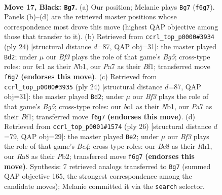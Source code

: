 \documentclass[11pt]{article}
\begin{document}
\clearpage

\begin{figure}[p]\centering
\begin{subfigure}{0.46\textwidth}\centering
\resizebox{\linewidth}{!}{%
\newchessgame
\chessboard[
  setfen={rnb1r1k1/pppnp2p/5b2/P5PR/2P5/1B3N2/1P3P2/RNB1K3 b Q - 0 17},
  showmover=false,
  pgfstyle=straightmove, color=movearrow, markmove={f6-g7}
]}
\caption{}
\end{subfigure}\hfill
\begin{subfigure}{0.46\textwidth}\centering
\resizebox{\linewidth}{!}{%
\newchessgame
\chessboard[
  setfen={rnb4r/ppp1k2p/1b3p2/3n2B1/3P4/5N2/PP4PP/RN2KB1R w KQ - 0 13},
  showmover=false,
  pgfstyle=straightmove, color=movearrow, markmove={g5-d2}
]}
\caption{}
\end{subfigure}
\\[4pt]
\begin{subfigure}{0.46\textwidth}\centering
\resizebox{\linewidth}{!}{%
\newchessgame
\chessboard[
  setfen={rnb4r/ppp1k2p/1b3p2/3n2B1/3P4/5N2/PP4PP/RN2KB1R w KQ - 0 13},
  showmover=false,
  pgfstyle=straightmove, color=movearrow, markmove={g5-d2}
]}
\caption{}
\end{subfigure}\hfill
\begin{subfigure}{0.46\textwidth}\centering
\resizebox{\linewidth}{!}{%
\newchessgame
\chessboard[
  setfen={rnb1k2r/b4pp1/p3p2p/1p6/2B1PPn1/1NN3P1/PP1B3P/R3K2R w KQkq - 0 14},
  showmover=false,
  pgfstyle=straightmove, color=movearrow, markmove={c4-e2}
]}
\caption{}
\end{subfigure}
\caption{\textbf{Move 17, Black: \texttt{Bg7}.} (a) Our position; Melanie plays \texttt{Bg7} (\texttt{f6g7}). Panels (b)--(d) are the retrieved master positions whose correspondence most drove this move (highest QAP objective among those that transfer to it). (b) Retrieved from \texttt{ccrl\_top\_p0000\#3934} (ply 24) [structural distance $d$=87, QAP obj=31]: the master played \texttt{Bd2}; under $\mu$ our \emph{Bf3} plays the role of that game's \emph{Bg5}; cross-type roles: our \emph{b}c1 as their \emph{N}b1, our \emph{P}a7 as their \emph{B}f1; transferred move \texttt{f6g7} \textbf{(endorses this move)}. (c) Retrieved from \texttt{ccrl\_top\_p0000\#3935} (ply 24) [structural distance $d$=87, QAP obj=31]: the master played \texttt{Bd2}; under $\mu$ our \emph{Bf3} plays the role of that game's \emph{Bg5}; cross-type roles: our \emph{b}c1 as their \emph{N}b1, our \emph{P}a7 as their \emph{B}f1; transferred move \texttt{f6g7} \textbf{(endorses this move)}. (d) Retrieved from \texttt{ccrl\_top\_p0001\#1574} (ply 26) [structural distance $d$=79, QAP obj=29]: the master played \texttt{Be2}; under $\mu$ our \emph{Bf3} plays the role of that game's \emph{Bc4}; cross-type roles: our \emph{B}c8 as their \emph{R}h1, our \emph{R}a8 as their \emph{P}b2; transferred move \texttt{f6g7} \textbf{(endorses this move)}. Synthesis: 7 retrieved analogs transferred to \texttt{Bg7} (summed QAP objective 165, the strongest correspondence among the candidate moves); Melanie committed it via the \texttt{search} selector.}
\label{fig:thought-m33}
\end{figure}
\end{document}
